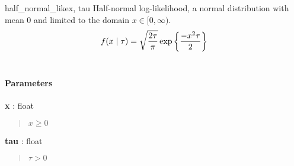 \hypertarget{pymc.distributions.half_normal_like}{}
\begin{funcdesc}{half\_normal\_like}{x, tau}
Half-normal log-likelihood, a normal distribution with mean 0 and limited
to the domain $x \in [0, \infty)$.
\begin{gather}
\begin{split}f(x \mid \tau) = \sqrt{\frac{2\tau}{\pi}}\exp\left\{ {\frac{-x^2 \tau}{2}}\right\}\end{split}\notag\\\begin{split}\end{split}\notag
\end{gather}
\paragraph{Parameters}
\begin{paramlist}
\item[] \textbf{x} : float
\begin{quote}

$x \ge 0$
\end{quote}

\item[] \textbf{tau} : float
\begin{quote}

$\tau > 0$
\end{quote}
\end{paramlist}
\end{funcdesc}

